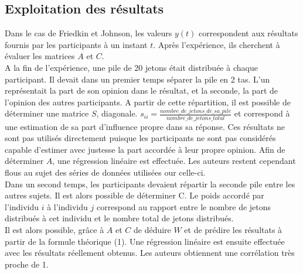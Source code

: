 \documentclass{scrreprt}
\begin{document}
\subsection{Exploitation des résultats}

Dans le cas de Friedkin et Johnson, les valeurs $y(t)$ correspondent aux résultats fournis par les participants à un instant $t$. Après l'expérience, ils cherchent à évaluer les matrices $A$ et $C$. \\ %



A la fin de l'expérience, une pile de 20 jetons était distribuée à chaque participant. Il devait dans un premier temps séparer la pile en 2 tas. L'un représentait la part de son opinion dans le résultat, et la seconde, la part de l'opinion des autres participants. A partir de cette répartition, il est possible de déterminer une matrice $S$, diagonale. $s_{ii} = \frac{nombre\_de\_jetons\_de\_sa\_pile}{nombre\_de\_jetons\_total}$ et correspond à une estimation de sa part d'influence propre dans sa réponse. Ces résultats ne sont pas utilisés directement puisque les participants ne sont pas considérés capable d'estimer avec justesse la part accordée à leur propre opinion. Afin de déterminer $A$, une régression linéaire est effectuée. Les auteurs restent cependant flous au sujet des séries de données utilisées our celle-ci.\\

Dans un second temps, les participants devaient répartir la seconde pile entre les autres sujets. Il est alors possible de déterminer C. Le poids accordé par l'individu $i$ à l'individu $j$ correspond au rapport entre le nombre de jetons distribués à cet individu et le nombre total de jetons distribués.\\

Il est alors possible, grâce à $A$ et $C$ de déduire $W$ et de prédire les résultats à partir de la formule théorique (1). Une régression linéaire est ensuite effectuée avec les résultats réellement obtenus. Les auteurs obtiennent une corrélation très proche de 1.
  
\end{document}

